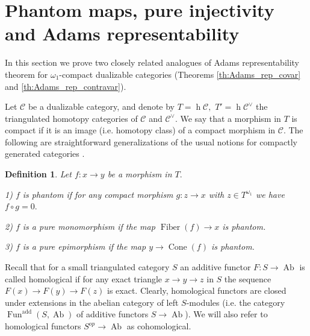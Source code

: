 \documentclass[11pt,leqno]{amsart}
\newtheorem{defi}[theo]{Definition}
\numberwithin{equation}{section}
\def\R{\mathbb{R}}
\def\h{\operatorname{h}}
\def\Hom{\operatorname{Hom}}
\newcommand{\indlim}[1][]{\mathop{\varinjlim}\limits_{#1}}
\newcommand{\Cone}{\operatorname{Cone}}
\newcommand{\Fiber}{\operatorname{Fiber}}
\newcommand{\cC}{{\mathcal C}}
\newcommand{\Fun}{\operatorname{Fun}}
\newcommand{\Ab}{\operatorname{Ab}}
\newcommand{\add}{\operatorname{add}}
\begin{document}

\section{Phantom maps, pure injectivity and Adams representability}
\label{app:Adams_representability}

In this section we prove two closely related analogues of Adams representability theorem for $\omega_1$-compact dualizable categories (Theorems \ref{th:Adams_rep_covar} and \ref{th:Adams_rep_contravar}).

Let $\cC$ be a dualizable category, and denote by $T=\h\cC,$ $T'=\h\cC^{\vee}$ the triangulated homotopy categories of $\cC$ and $\cC^{\vee}.$ We say that a morphism in $T$ is compact if it is an image (i.e. homotopy class) of a compact morphism in $\cC.$ The following are straightforward generalizations of the usual notions for compactly generated categories \cite{Kr00, GP04}.

\begin{defi} Let $f:x\to y$ be a morphism in $T.$
	
	1) $f$ is phantom if for any compact morphism $g:z\to x$ with $z\in T^{\omega_1}$ we have $f\circ g=0.$
	
	2) $f$ is a pure monomorphism if the map $\Fiber(f)\to x$ is phantom.
	
	3) $f$ is a pure epimorphism if the map $y\to\Cone(f)$ is phantom. 
\end{defi}

Recall that for a small triangulated category $S$ an additive functor $F:S\to\Ab$ is called homological if for any exact triangle $x\to y\to z$ in $S$ the sequence $F(x)\to F(y)\to F(z)$ is exact. Clearly, homological functors are closed under extensions in the abelian category of left $S$-modules (i.e. the category $\Fun^{\add}(S,\Ab)$ of additive functors $S\to\Ab$). We will also refer to homological functors $S^{op}\to \Ab$ as cohomological.
\end{document}
